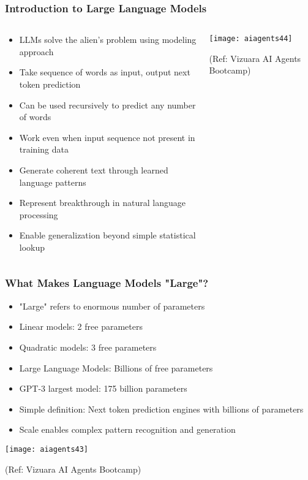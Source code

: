 \begin{frame}[fragile]\frametitle{Introduction to Large Language Models}

\begin{columns}
    \begin{column}[T]{0.6\linewidth}
      \begin{itemize}
	  \item LLMs solve the alien's problem using modeling approach
	  \item Take sequence of words as input, output next token prediction
	  \item Can be used recursively to predict any number of words
	  \item Work even when input sequence not present in training data
	  \item Generate coherent text through learned language patterns
	  \item Represent breakthrough in natural language processing
	  \item Enable generalization beyond simple statistical lookup
	  \end{itemize}

    \end{column}
    \begin{column}[T]{0.4\linewidth}
		\begin{center}
		\texttt{[image: aiagents44]}

		{\tiny (Ref: Vizuara AI Agents Bootcamp)}

		\end{center}	
    \end{column}
  \end{columns}
	  
\end{frame}

\begin{frame}[fragile]\frametitle{What Makes Language Models "Large"?}
      \begin{itemize}
	  \item "Large" refers to enormous number of parameters
	  \item Linear models: 2 free parameters
	  \item Quadratic models: 3 free parameters
	  \item Large Language Models: Billions of free parameters
	  \item GPT-3 largest model: 175 billion parameters
	  \item Simple definition: Next token prediction engines with billions of parameters
	  \item Scale enables complex pattern recognition and generation
	  \end{itemize}
		\begin{center}
		\texttt{[image: aiagents43]}

		{\tiny (Ref: Vizuara AI Agents Bootcamp)}

		\end{center}		  
\end{frame}


